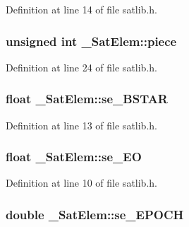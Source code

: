 Definition at line 14 of file satlib.\-h.

\hypertarget{struct___sat_elem_a94bd5ae73f4c4bb55677d3a0e998eef2}{
\subsubsection[{piece}]{\setlength{\rightskip}{0pt plus 5cm}unsigned int \-\_\-\-Sat\-Elem\-::piece}}\label{struct___sat_elem_a94bd5ae73f4c4bb55677d3a0e998eef2}


Definition at line 24 of file satlib.\-h.

\hypertarget{struct___sat_elem_a282db948ea254d1ca2de2dfc9ee698c0}{
\subsubsection[{se\-\_\-\-B\-S\-T\-A\-R}]{\setlength{\rightskip}{0pt plus 5cm}float \-\_\-\-Sat\-Elem\-::se\-\_\-\-B\-S\-T\-A\-R}}\label{struct___sat_elem_a282db948ea254d1ca2de2dfc9ee698c0}


Definition at line 13 of file satlib.\-h.

\hypertarget{struct___sat_elem_a11986bb255a52da8614cfacc1155bf89}{
\subsubsection[{se\-\_\-\-E\-O}]{\setlength{\rightskip}{0pt plus 5cm}float \-\_\-\-Sat\-Elem\-::se\-\_\-\-E\-O}}\label{struct___sat_elem_a11986bb255a52da8614cfacc1155bf89}


Definition at line 10 of file satlib.\-h.

\hypertarget{struct___sat_elem_a31e22c4bf1c6745eaa88c19e1fb78cab}{
\subsubsection[{se\-\_\-\-E\-P\-O\-C\-H}]{\setlength{\rightskip}{0pt plus 5cm}double \-\_\-\-Sat\-Elem\-::se\-\_\-\-E\-P\-O\-C\-H}}\label{struct___sat_elem_a31e22c4bf1c6745eaa88c19e1fb78cab}


